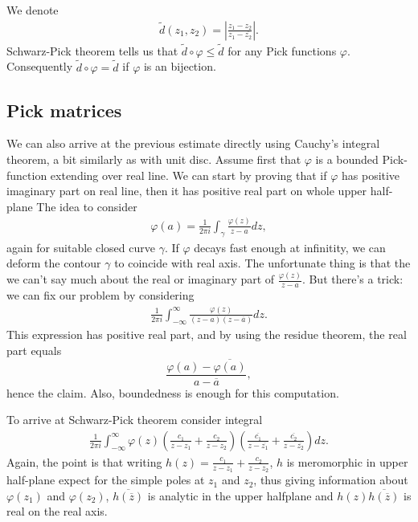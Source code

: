 We denote
\begin{align*}
	\tilde{d}(z_{1}, z_{2}) = \left|\frac{z_{1} - z_{2}}{z_{1} - \overline{z_{2}}} \right|.
\end{align*}
Schwarz-Pick theorem tells us that $\tilde{d} \circ \varphi \leq \tilde{d}$ for any Pick functions $\varphi$. Consequently $\tilde{d} \circ \varphi = \tilde{d}$ if $\varphi$ is an bijection.

\subsection{Pick matrices}

We can also arrive at the previous estimate directly using Cauchy's integral theorem, a bit similarly as with unit disc. Assume first that $\varphi$ is a bounded Pick-function extending over real line. We can start by proving that if $\varphi$ has positive imaginary part on real line, then it has positive real part on whole upper half-plane The idea to consider
\begin{align*}
	\varphi(a) = \frac{1}{2 \pi i}\int_{\gamma} \frac{\varphi(z)}{z - a} dz,
\end{align*}
again for suitable closed curve $\gamma$. If $\varphi$ decays fast enough at infinitity, we can deform the contour $\gamma$ to coincide with real axis. The unfortunate thing is that the we can't say much about the real or imaginary part of $ \frac{\varphi(z)}{z - a}$. But there's a trick: we can fix our problem by considering
\begin{align*}
	\frac{1}{2 \pi i}\int_{-\infty}^{\infty} \frac{\varphi(z)}{(z - a) (z - \overline{a})} dz.
\end{align*}
This expression has positive real part, and by using the residue theorem, the real part equals
\[
	\frac{\varphi(a) - \overline{\varphi(a)}}{a - \overline{a}},
\]
hence the claim. Also, boundedness is enough for this computation.

To arrive at Schwarz-Pick theorem consider integral
\begin{align*}
	\frac{1}{2 \pi i}\int_{-\infty}^{\infty} \varphi(z) \left(\frac{c_{1}}{z - z_{1}} + \frac{c_{2}}{z - z_{2}} \right) \left(\frac{\overline{c_{1}}}{z - \overline{z_{1}}} + \frac{\overline{c_{2}}}{z - \overline{z_{2}}} \right) dz.
\end{align*}
Again, the point is that writing $h(z) = \frac{c_{1}}{z - z_{1}} + \frac{c_{2}}{z - z_{2}}$, $h$ is meromorphic in upper half-plane expect for the simple poles at $z_{1}$ and $z_{2}$, thus giving information about $\varphi(z_{1})$ and $\varphi(z_{2})$, $\overline{h(\overline{z})}$ is analytic in the upper halfplane and $h(z)\overline{h(\overline{z})}$ is real on the real axis.

